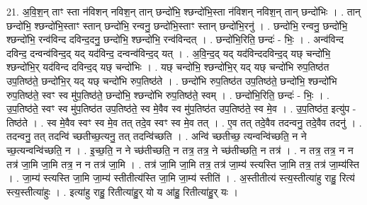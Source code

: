 \documentclass[17pt]{extarticle}
\begin{document}
21. अ॒वि॒श॒न् ताꣳ स्ता न॑विशन् नविश॒न् तान् छन्दो॑भि॒ श्छन्दो॑भि॒स्ता न॑विशन् नविश॒न् तान् छन्दो॑भिः । . तान् छन्दो॑भि॒ श्छन्दो॑भि॒स्ताꣳ स्तान् छन्दो॑भि॒ रन्वनु॒ छन्दो॑भि॒स्ताꣳ स्तान् छन्दो॑भि॒रनु॑ । . छन्दो॑भि॒ रन्वनु॒ छन्दो॑भि॒ श्छन्दो॑भि॒ रन्व॑विन्द दविन्द॒दनु॒ छन्दो॑भि॒ श्छन्दो॑भि॒ रन्व॑विन्दत् । . छन्दो॑भि॒रिति॒ छन्दः॑ - भिः॒ । . अन्व॑विन्द दविन्द॒ दन्वन्व॑विन्द॒द् यद् यद॑विन्द॒ दन्वन्व॑विन्द॒द् यत् । . अ॒वि॒न्द॒द् यद् यद॑विन्ददविन्द॒द् यछ् चन्दो॑भि॒ श्छन्दो॑भि॒र् यद॑विन्द दविन्द॒द् यछ् चन्दो॑भिः । . यछ् चन्दो॑भि॒ श्छन्दो॑भि॒र् यद् यछ् चन्दो॑भि रुप॒तिष्ठ॑त उप॒तिष्ठ॑ते॒ छन्दो॑भि॒र् यद् यछ् चन्दो॑भि रुप॒तिष्ठ॑ते । . छन्दो॑भि रुप॒तिष्ठ॑त उप॒तिष्ठ॑ते॒ छन्दो॑भि॒ श्छन्दो॑भि रुप॒तिष्ठ॑ते॒ स्वꣳ स्व मु॑प॒तिष्ठ॑ते॒ छन्दो॑भि॒ श्छन्दो॑भि रुप॒तिष्ठ॑ते॒ स्वम् । . छन्दो॑भि॒रिति॒ छन्दः॑ - भिः॒ । . उ॒प॒तिष्ठ॑ते॒ स्वꣳ स्व मु॑प॒तिष्ठ॑त उप॒तिष्ठ॑ते॒ स्व मे॒वैव स्व मु॑प॒तिष्ठ॑त उप॒तिष्ठ॑ते॒ स्व मे॒व । . उ॒प॒तिष्ठ॑त॒ इत्यु॑प - तिष्ठ॑ते । . स्व मे॒वैव स्वꣳ स्व मे॒व तत् तदे॒व स्वꣳ स्व मे॒व तत् । . ए॒व तत् तदे॒वैव तदन्वनु॒ तदे॒वैव तदनु॑ । . तदन्वनु॒ तत् तदन्वि॑ च्छतीच्छ॒त्यनु॒ तत् तदन्वि॑च्छति । . अन्वि॑ च्छतीच्छ॒ त्यन्वन्वि॑च्छति॒ न ने च्छ॒त्यन्वन्वि॑च्छति॒ न । . इ॒च्छ॒ति॒ न ने च्छ॑तीच्छति॒ न तत्र॒ तत्र॒ ने च्छ॑तीच्छति॒ न तत्र॑ । . न तत्र॒ तत्र॒ न न तत्र॑ जा॒मि जा॒मि तत्र॒ न न तत्र॑ जा॒मि । . तत्र॑ जा॒मि जा॒मि तत्र॒ तत्र॑ जा॒म्य॑ स्त्यस्ति जा॒मि तत्र॒ तत्र॑ जा॒म्य॑स्ति । . जा॒म्य॑ स्त्यस्ति जा॒मि जा॒म्य॑ स्तीतीत्य॑स्ति जा॒मि जा॒म्य॑ स्तीति॑ । . अ॒स्तीतीत्य॑ स्त्य॒स्तीत्या॑हु राहु॒ रित्य॑ स्त्य॒स्तीत्या॑हुः । . इत्या॑हु राहु॒ रितीत्या॑हु॒र् यो य आ॑हु॒ रितीत्या॑हु॒र् यः । \newline
\end{document}
